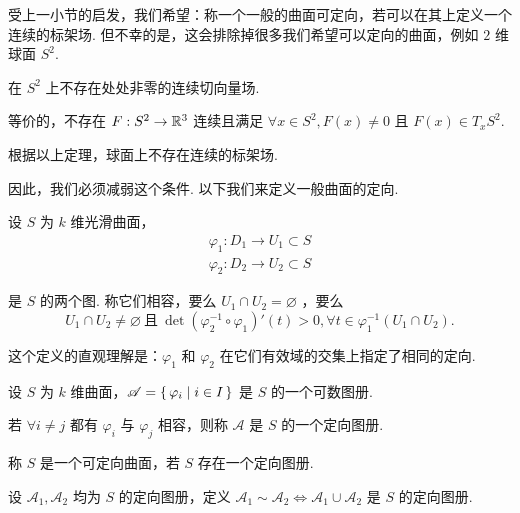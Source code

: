 
受上一小节的启发，我们希望：称一个一般的曲面可定向，若可以在其上定义一个连续的标架场. 但不幸的是，这会排除掉很多我们希望可以定向的曲面，例如 $2$ 维球面 $S^2$.

\begin{theorem}
在 $S^2$ 上不存在处处非零的连续切向量场.

等价的，不存在 $F:S^2\to\mathbb{R}^3$ 连续且满足 $\forall x\in S^2,F(x)\ne 0$ 且 $F(x)\in T_xS^2$.
\end{theorem}

根据以上定理，球面上不存在连续的标架场.

因此，我们必须减弱这个条件. 以下我们来定义一般曲面的定向.

\begin{definition}
设 $S$ 为 $k$ 维光滑曲面，
$$
\begin{aligned}
\varphi_1:D_1\to U_1\subset S\\
\varphi_2:D_2\to U_2\subset S
\end{aligned}
$$

是 $S$ 的两个图. 称它们相容，要么 $U_1\cap U_2=\varnothing$ ，要么
$$
U_1\cap U_2\ne\varnothing~\text{且}~\det(\varphi_2^{-1}\circ\varphi_1)'(t)>0,\forall t\in\varphi_1^{-1}(U_1\cap U_2).
$$
\end{definition}


\begin{hint}
这个定义的直观理解是：$\varphi_1$ 和 $\varphi_2$ 在它们有效域的交集上指定了相同的定向.
\end{hint}

\begin{definition}
设 $S$ 为 $k$ 维曲面，$\mathscr{A}=\set{\varphi_i|i\in I}$ 是 $S$ 的一个可数图册.

若 $\forall i\ne j$ 都有 $\varphi_i$ 与 $\varphi_j$ 相容，则称 $\mathscr{A}$ 是 $S$ 的一个定向图册.
\end{definition}

\begin{definition}
称 $S$ 是一个可定向曲面，若 $S$ 存在一个定向图册.
\end{definition}

\begin{definition}
设 $\mathscr{A}_1,\mathscr{A}_2$ 均为 $S$ 的定向图册，定义 $\mathscr{A}_1\sim\mathscr{A}_2\iff \mathscr{A}_1\cup\mathscr{A}_2$ 是 $S$ 的定向图册.
\end{definition}

